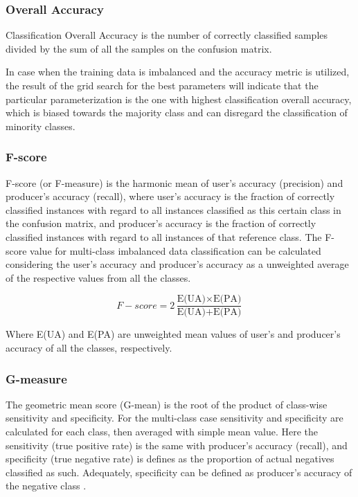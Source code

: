 \documentclass[parskip=full]{scrartcl}
\begin{document}
\subsubsection{Overall Accuracy}

Classification Overall Accuracy is the number of correctly classified samples
divided by the sum of all the samples on the confusion matrix. 

In case when the training data is imbalanced and the accuracy metric is 
utilized, the result of the grid search for the best parameters will indicate 
that the particular parameterization is the one with highest classification 
overall accuracy, which is biased towards the majority class and can disregard 
the classification of minority classes.

\subsubsection{F-score}

F-score (or F-measure) is the harmonic mean of user's accuracy (precision) and
producer's accuracy (recall), where user's accuracy is the fraction of
correctly classified instances with regard to all instances classified as this
certain class in the confusion matrix, and producer's accuracy is the fraction
of  correctly classified instances with regard to all instances of that
reference class. The F-score value for multi-class imbalanced data
classification can be calculated considering the user's accuracy and producer's
accuracy as a unweighted average of the respective values from all the classes.

\[
F{-}score=2\frac{\text{E(UA)} \times \text{E(PA)}}{\text{E(UA)} + \text{E(PA)}}
\]

Where E(UA) and E(PA) are unweighted mean values of user's and producer's
accuracy of all the classes, respectively.

\subsubsection{G-measure}

The geometric mean score (G-mean) is the root of the product of class-wise
sensitivity and specificity. For the multi-class case sensitivity and
specificity are calculated for each class, then averaged with simple mean
value. Here the sensitivity (true positive rate) is the same with producer's 
accuracy (recall), and specificity (true negative rate) is defines as
the proportion of actual negatives classified as such. Adequately, specificity 
can be defined as producer's accuracy of the negative class \cite{Silva2017}.
\end{document}
